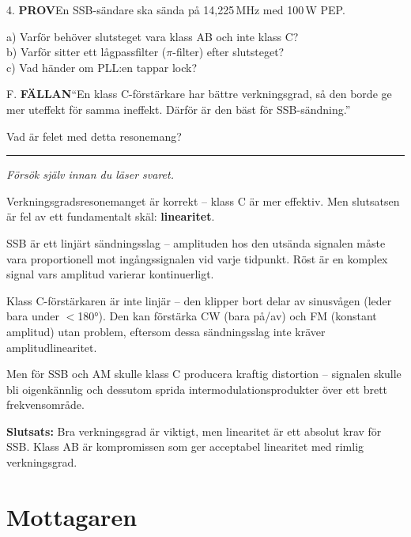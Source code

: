 \documentclass[a4paper,11pt,twoside]{book}
\newcommand{\qprov}{\colorbox{redpale}{\textcolor{reddark}{\headingfont\bfseries\tiny PROV}}}
\newcommand{\qfallan}{\colorbox{ljusbrun}{\textcolor{kakao}{\headingfont\bfseries\tiny FÄLLAN}}}
\begin{document}
\begin{qblock}{4.}
\qprov\quad En SSB-sändare ska sända på 14,225\,MHz med 100\,W PEP.

a) Varför behöver slutsteget vara klass AB och inte klass C?\\
b) Varför sitter ett lågpassfilter ($\pi$-filter) efter slutsteget?\\
c) Vad händer om PLL:en tappar lock?
\end{qblock}

\begin{qblock}{F.}
\qfallan\quad ``En klass C-förstärkare har bättre verkningsgrad,
så den borde ge mer uteffekt för samma ineffekt. Därför är den
bäst för SSB-sändning.''

Vad är felet med detta resonemang?
\end{qblock}

\medskip
\noindent\rule{\textwidth}{0.4pt}
{\small\itshape Försök själv innan du läser svaret.}
\medskip

\begin{worked}[title={Lösning -- Fallgropsfråga 2.3\,F}]
Verkningsgradsresonemanget är korrekt -- klass C är mer effektiv.
Men slutsatsen är fel av ett fundamentalt skäl: \textbf{linearitet}.

SSB är ett linjärt sändningsslag -- amplituden hos den utsända
signalen måste vara proportionell mot ingångssignalen vid varje
tidpunkt. Röst är en komplex signal vars amplitud varierar
kontinuerligt.

Klass C-förstärkaren är inte linjär -- den klipper bort delar av
sinusvågen (leder bara under $<$180°). Den kan förstärka CW (bara
på/av) och FM (konstant amplitud) utan problem, eftersom dessa
sändningsslag inte kräver amplitudlinearitet.

Men för SSB och AM skulle klass C producera kraftig distortion --
signalen skulle bli oigenkännlig och dessutom sprida
intermodulationsprodukter över ett brett frekvensområde.

\textbf{Slutsats:} Bra verkningsgrad är viktigt, men linearitet
är ett absolut krav för SSB. Klass AB är kompromissen som ger
acceptabel linearitet med rimlig verkningsgrad.
\end{worked}

\section{Mottagaren}
\end{document}
